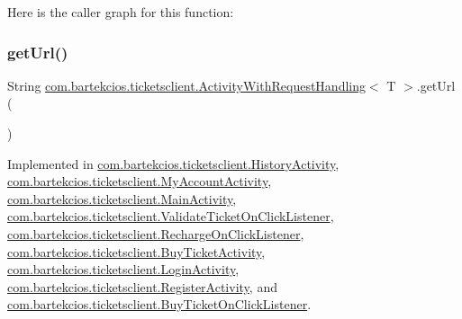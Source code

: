 Here is the caller graph for this function\+:
\mbox{\label{interfacecom_1_1bartekcios_1_1ticketsclient_1_1_activity_with_request_handling_a6a0c2f3b1ec60ef01b6a6da8c3c54b18}} 
\subsubsection{\texorpdfstring{get\+Url()}{getUrl()}}
{\footnotesize\ttfamily String \hyperlink{interfacecom_1_1bartekcios_1_1ticketsclient_1_1_activity_with_request_handling}{com.\+bartekcios.\+ticketsclient.\+Activity\+With\+Request\+Handling}$<$ T $>$.get\+Url (\begin{DoxyParamCaption}{ }\end{DoxyParamCaption})}



Implemented in \hyperlink{classcom_1_1bartekcios_1_1ticketsclient_1_1_history_activity_a3cb43e0b991a2d216dafe1c561a04467}{com.\+bartekcios.\+ticketsclient.\+History\+Activity}, \hyperlink{classcom_1_1bartekcios_1_1ticketsclient_1_1_my_account_activity_aeaa4e36c6a93bfc13f27cfae2c795074}{com.\+bartekcios.\+ticketsclient.\+My\+Account\+Activity}, \hyperlink{classcom_1_1bartekcios_1_1ticketsclient_1_1_main_activity_a7661600c51d0a7e9c57438d8ea427880}{com.\+bartekcios.\+ticketsclient.\+Main\+Activity}, \hyperlink{classcom_1_1bartekcios_1_1ticketsclient_1_1_validate_ticket_on_click_listener_a4e7ec5237a45c0af64a98fd128a08c8a}{com.\+bartekcios.\+ticketsclient.\+Validate\+Ticket\+On\+Click\+Listener}, \hyperlink{classcom_1_1bartekcios_1_1ticketsclient_1_1_recharge_on_click_listener_ae0509f212c88b2b143c0285970c9674d}{com.\+bartekcios.\+ticketsclient.\+Recharge\+On\+Click\+Listener}, \hyperlink{classcom_1_1bartekcios_1_1ticketsclient_1_1_buy_ticket_activity_a508922389c8768aa14a5da8645865aec}{com.\+bartekcios.\+ticketsclient.\+Buy\+Ticket\+Activity}, \hyperlink{classcom_1_1bartekcios_1_1ticketsclient_1_1_login_activity_aaad16b575d23587ea31865662633e12f}{com.\+bartekcios.\+ticketsclient.\+Login\+Activity}, \hyperlink{classcom_1_1bartekcios_1_1ticketsclient_1_1_register_activity_a2090c93d14ba708273bbc4c82665ce91}{com.\+bartekcios.\+ticketsclient.\+Register\+Activity}, and \hyperlink{classcom_1_1bartekcios_1_1ticketsclient_1_1_buy_ticket_on_click_listener_a194710d8152375b3340ae8382c31cb37}{com.\+bartekcios.\+ticketsclient.\+Buy\+Ticket\+On\+Click\+Listener}.

